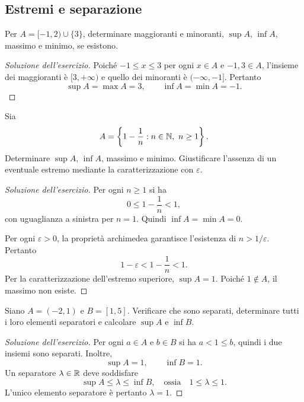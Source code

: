 \subsection{Estremi e separazione}
\label{sec:esercizi-fondamenti-estremi}

\begin{exercise}
\label{ex:fondamenti-estremi-unione-intervalli}
Per $A=[-1,2)\cup\{3\}$, determinare maggioranti e minoranti,
$\sup A$, $\inf A$, massimo e minimo, se esistono.
\end{exercise}
\begin{proof}[Soluzione dell'esercizio]
Poiché $-1\le x\le3$ per ogni $x\in A$ e $-1,3\in A$,
l'insieme dei maggioranti è $[3,+\infty)$ e quello dei
minoranti è $(-\infty,-1]$. Pertanto
\[
  \sup A=\max A=3,\qquad \inf A=\min A=-1.
\]
\end{proof}

\begin{exercise}
\label{ex:fondamenti-estremi-insieme-indicizzato}
Sia
\[
  A=\left\{1-\frac1n:n\in\N,\ n\ge1\right\}.
\]
Determinare $\sup A$, $\inf A$, massimo e minimo.
Giustificare l'assenza di un eventuale estremo mediante
la caratterizzazione con $\varepsilon$.
\end{exercise}
\begin{proof}[Soluzione dell'esercizio]
Per ogni $n\ge1$ si ha
\[
  0\le1-\frac1n<1,
\]
con uguaglianza a sinistra per $n=1$. Quindi
$\inf A=\min A=0$.

Per ogni $\varepsilon>0$, la proprietà archimedea garantisce
l'esistenza di $n>1/\varepsilon$. Pertanto
\[
  1-\varepsilon<1-\frac1n<1.
\]
Per la caratterizzazione dell'estremo superiore,
$\sup A=1$. Poiché $1\notin A$, il massimo non esiste.
\end{proof}

\begin{exercise}
\label{ex:fondamenti-separazione-due-insiemi}
Siano $A=(-2,1)$ e $B=[1,5]$. Verificare che sono separati,
determinare tutti i loro elementi separatori e calcolare
$\sup A$ e $\inf B$.
\end{exercise}
\begin{proof}[Soluzione dell'esercizio]
Per ogni $a\in A$ e $b\in B$ si ha $a<1\le b$,
quindi i due insiemi sono separati. Inoltre,
\[
  \sup A=1,\qquad \inf B=1.
\]
Un separatore $\lambda\in\mathbb{R}$ deve soddisfare
\[
  \sup A\le\lambda\le\inf B,
  \quad\text{ossia}\quad 1\le\lambda\le1.
\]
L'unico elemento separatore è pertanto $\lambda=1$.
\end{proof}

